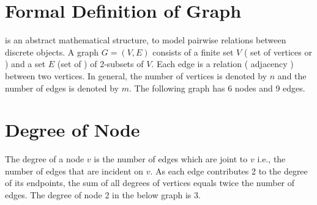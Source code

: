\documentclass[twoside,12pt,a4paper,english]{book}
\theoremstyle{definition}
\theoremstyle{problemstyle}
\theoremstyle{problemstyle}
\theoremstyle{problemstyle}
\begin{document}
\section{Formal Definition of Graph}
 is an abstract mathematical structure, to model pairwise relations between discrete objects. A graph $G = (V,E)$ consists of a finite set $V$ ( set of vertices or  ) and a set $E$ (set of  ) of 2-subsets of $V$. Each edge is a relation ( adjacency ) between two vertices. In general, the number of vertices is denoted by $n$ and the number of edges is denoted by $m$. The following graph has 6 nodes and 9 edges.

\begin{center}
\end{center}
\section{Degree of Node}
The degree of a node $v$ is the number of edges which are joint to $v$ i.e., the number of edges that are incident on $v$. As each edge contributes 2 to the degree of its endpoints, the sum of all degrees of vertices equals twice the number of edges. The degree of node 2 in the below graph is 3.

\begin{center}
\end{center}
\end{document}

